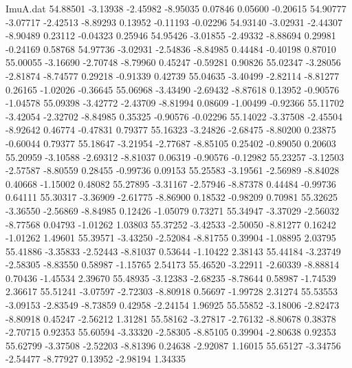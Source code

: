 \begin{filecontents}{ImuA.dat}
  54.88501   -3.13938   -2.45982   -8.95035    0.07846    0.05600   -0.20615
  54.90777   -3.07717   -2.42513   -8.89293    0.13952   -0.11193   -0.02296
  54.93140   -3.02931   -2.44307   -8.90489    0.23112   -0.04323    0.25946
  54.95426   -3.01855   -2.49332   -8.88694    0.29981   -0.24169    0.58768
  54.97736   -3.02931   -2.54836   -8.84985    0.44484   -0.40198    0.87010
  55.00055   -3.16690   -2.70748   -8.79960    0.45247   -0.59281    0.90826
  55.02347   -3.28056   -2.81874   -8.74577    0.29218   -0.91339    0.42739
  55.04635   -3.40499   -2.82114   -8.81277    0.26165   -1.02026   -0.36645
  55.06968   -3.43490   -2.69432   -8.87618    0.13952   -0.90576   -1.04578
  55.09398   -3.42772   -2.43709   -8.81994    0.08609   -1.00499   -0.92366
  55.11702   -3.42054   -2.32702   -8.84985    0.35325   -0.90576   -0.02296
  55.14022   -3.37508   -2.45504   -8.92642    0.46774   -0.47831    0.79377
  55.16323   -3.24826   -2.68475   -8.80200    0.23875   -0.60044    0.79377
  55.18647   -3.21954   -2.77687   -8.85105    0.25402   -0.89050    0.20603
  55.20959   -3.10588   -2.69312   -8.81037    0.06319   -0.90576   -0.12982
  55.23257   -3.12503   -2.57587   -8.80559    0.28455   -0.99736    0.09153
  55.25583   -3.19561   -2.56989   -8.84028    0.40668   -1.15002    0.48082
  55.27895   -3.31167   -2.57946   -8.87378    0.44484   -0.99736    0.64111
  55.30317   -3.36909   -2.61775   -8.86900    0.18532   -0.98209    0.70981
  55.32625   -3.36550   -2.56869   -8.84985    0.12426   -1.05079    0.73271
  55.34947   -3.37029   -2.56032   -8.77568    0.04793   -1.01262    1.03803
  55.37252   -3.42533   -2.50050   -8.81277    0.16242   -1.01262    1.49601
  55.39571   -3.43250   -2.52084   -8.81755    0.39904   -1.08895    2.03795
  55.41886   -3.35833   -2.52443   -8.81037    0.53644   -1.10422    2.38143
  55.44184   -3.23749   -2.58305   -8.83550    0.58987   -1.15765    2.54173
  55.46520   -3.22911   -2.60339   -8.88814    0.70436   -1.45534    2.39670
  55.48935   -3.12383   -2.68235   -8.78644    0.58987   -1.74539    2.36617
  55.51241   -3.07597   -2.72303   -8.80918    0.56697   -1.99728    2.31274
  55.53553   -3.09153   -2.83549   -8.73859    0.42958   -2.24154    1.96925
  55.55852   -3.18006   -2.82473   -8.80918    0.45247   -2.56212    1.31281
  55.58162   -3.27817   -2.76132   -8.80678    0.38378   -2.70715    0.92353
  55.60594   -3.33320   -2.58305   -8.85105    0.39904   -2.80638    0.92353
  55.62799   -3.37508   -2.52203   -8.81396    0.24638   -2.92087    1.16015
  55.65127   -3.34756   -2.54477   -8.77927    0.13952   -2.98194    1.34335

\end{filecontents}
